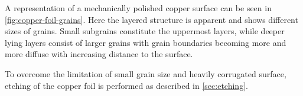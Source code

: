  A representation of a mechanically polished copper surface can be seen in \autoref{fig:copper-foil-grains}. Here the layered structure is apparent and shows different sizes of grains. Small subgrains constitute the uppermost layers, while deeper lying layers consist of larger grains with grain boundaries becoming more and more diffuse with increasing distance to the surface. 
 
To overcome the limitation of small grain size and heavily corrugated surface, etching of the copper foil is performed as described in \autoref{sec:etching}.